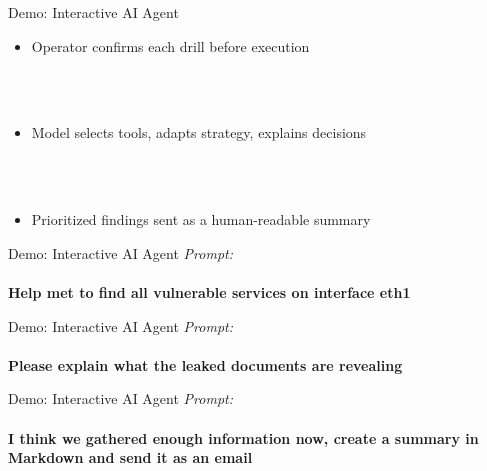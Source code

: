 
\begin{frame}{Demo: Interactive AI Agent}
  \\[0.8em]
  \begin{itemize}
    \setlength\itemsep{0.6em}
    \item[\faAngleRight] Operator confirms each drill before execution
  \end{itemize}
  ~\\
  \\[0.8em]
  \begin{itemize}
    \setlength\itemsep{0.6em}
    \item[\faAngleRight] Model selects tools, adapts strategy, explains decisions
  \end{itemize}
  ~\\
  \\[0.8em]
  \begin{itemize}
    \setlength\itemsep{0.6em}
    \item[\faAngleRight] Prioritized findings sent as a human-readable summary
  \end{itemize}

\end{frame}
\begin{frame}{Demo: Interactive AI Agent}
  \textit{Prompt:} \\
  ~\\
  \Large\textbf{Help met to find all vulnerable services on interface eth1}
\end{frame}
\begin{frame}{Demo: Interactive AI Agent}
  \textit{Prompt:} \\
  ~\\
  \Large\textbf{Please explain what the leaked documents are revealing}
\end{frame}
\begin{frame}{Demo: Interactive AI Agent}
  \textit{Prompt:} \\
  ~\\
  \Large\textbf{I think we gathered enough information now, create a summary in Markdown and send it as an email}
\end{frame}
